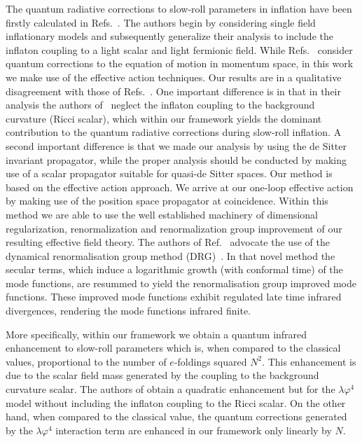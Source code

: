 \documentclass[aps,12pt,superscriptaddress,preprintnumbers,
                secnumarabic,nofootinbib,showpacs]{revtex4}
\begin{document}
The quantum radiative corrections to slow-roll parameters in inflation have
been firstly calculated in
Refs.~\cite{BoyanovskydeVegaSanchez:2006,BoyanovskydeVegaSanchez:2005,Boyanovsky:2004ph}.
The authors begin by considering single field inflationary models
and subsequently generalize their analysis to include the inflaton
coupling to a light scalar and light fermionic field. While
Refs.~\cite{BoyanovskydeVegaSanchez:2006,BoyanovskydeVegaSanchez:2005}
consider quantum corrections to the equation of motion in momentum space, 
in this work we make use of the effective action techniques.
 Our results are in a qualitative disagreement with those of
Refs.~\cite{BoyanovskydeVegaSanchez:2006,BoyanovskydeVegaSanchez:2005,Boyanovsky:2004ph}.
One important difference is in that in their analysis the authors 
of~\cite{BoyanovskydeVegaSanchez:2006,BoyanovskydeVegaSanchez:2005,Boyanovsky:2004ph}
neglect the inflaton coupling to the background curvature (Ricci scalar), 
which within our framework yields the dominant contribution 
to the quantum radiative corrections during slow-roll inflation.
 A second important difference is that we made our analysis by using 
the de Sitter invariant propagator, while the proper analysis should be
conducted by making use of a scalar propagator suitable for
quasi-de Sitter spaces. Our method is based on the effective action 
approach. We arrive at our one-loop effective action
by making use of the position space propagator at coincidence.
Within this method we are able to use the well established
machinery of dimensional regularization, renormalization and
renormalization group improvement of our resulting effective field theory.
The authors of Ref.~\cite{Boyanovsky:2004ph} advocate the use of the
dynamical renormalisation group method (DRG)~\cite{Boyanovsky:2004gq}.
In that novel method the secular terms, which induce
a logarithmic growth (with conformal time) of the mode functions,
are resummed to yield the renormalisation group improved mode functions.
These improved mode functions exhibit regulated late time infrared divergences,
rendering the mode functions infrared finite. 

 More specifically, within our framework we obtain
 a quantum infrared enhancement to slow-roll parameters which is,
when compared to the classical values,
proportional to the number of $e$-foldings squared $N^2$. 
This enhancement is due to the scalar field mass generated by the coupling
to the background curvature scalar.
The authors
of \cite{BoyanovskydeVegaSanchez:2006,BoyanovskydeVegaSanchez:2005,Boyanovsky:2004ph}
obtain a quadratic enhancement but for the $\lambda\varphi^4$ model
without including the inflaton coupling to the Ricci scalar.
On the other hand, when compared to the classical value, 
the quantum corrections generated by the $\lambda\varphi^4$ 
interaction term are enhanced in our framework only linearly by $N$.
\end{document}
